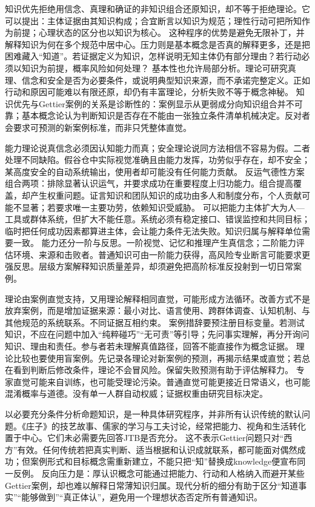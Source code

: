 知识优先拒绝用信念、真理和确证的非知识组合还原知识，却不等于拒绝理论。它可以提出：主体证据由其知识构成；合宜断言以知识为规范；理性行动可把所知作为前提；心理状态的区分也以知识为核心\parencite{williamson2000}。 这种程序的优势是避免无限补丁，并解释知识为何在多个规范中居中心。压力则是基本概念是否真的解释更多，还是把困难藏入“知道”。若证据定义为知识，怎样说明无知主体仍有部分理由？若行动必须以知识为前提，概率风险如何处理？ 基本性也允许局部分析。理论可研究真理、信念和安全是否为必要条件，或说明典型知识来源，而不承诺完整定义。正如行动和原因可能难以有限还原，却仍有丰富理论，分析失败不等于概念神秘。 知识优先与Gettier案例的关系是诊断性的：案例显示从更弱成分向知识组合并不可靠；基本概念论认为判断知识是否存在不能由一张独立条件清单机械决定。反对者会要求可预测的新案例标准，而非只凭整体直觉。

能力理论说真信念必须因认知能力而真；安全理论说同方法相信不容易为假。二者处理不同缺陷。假谷仓中实际视觉准确且由能力发挥，功劳似乎存在，却不安全；某高度安全的自动系统输出，使用者却可能没有任何能力贡献。 反运气德性方案组合两项：排除显著认识运气，并要求成功在重要程度上归功能力\parencite{pritchard2012}。组合提高覆盖，却产生权重问题。证言知识和团队知识的成功由多人和制度分布，个人贡献可能不显著；若要求唯一主要功劳，依赖知识受威胁。 可以把能力主体扩大为人—工具或群体系统，但扩大不能任意。系统必须有稳定接口、错误监控和共同目标；临时把任何成功因素都算进主体，会让能力条件无法失败。知识归属与解释单位需要一致。 能力还分一阶与反思。一阶视觉、记忆和推理产生真信念；二阶能力评估环境、来源和击败者。普通知识可由一阶能力获得，高风险专业断言可能要求更强反思。层级方案解释知识质量差异，却须避免把高阶标准反投射到一切日常案例。

理论由案例直觉支持，又用理论解释相同直觉，可能形成方法循环。改善方式不是放弃案例，而是增加证据来源：最小对比、语言使用、跨群体调查、认知机制、与其他规范的系统联系。不同证据互相约束。 案例措辞要预注册目标变量。若测试知识，不应在问题中加入“纯粹碰巧”“无可责”等引导；先问事实理解，再分开询问知识、理由和责任。参与者若未理解真值路径，回答不能直接作为概念证据。 理论比较也要使用盲案例。先记录各理论对新案例的预测，再揭示结果或直觉；若总在看到判断后修改条件，理论不会冒风险。保留失败预测有助于评估解释力。 专家直觉可能来自训练，也可能受理论污染。普通直觉可能更接近日常语义，也可能混淆概率与道德。没有单一人群自动权威；证据权重由研究目标决定。

以必要充分条件分析命题知识，是一种具体研究程序，并非所有认识传统的默认问题。《庄子》的技艺故事、儒家的学习与工夫讨论，经常把能力、视角和生活转化置于中心\parencite{analects2003,zhuangzi2009}。它们未必需要先回答JTB是否充分。 这不表示Gettier问题只对“西方”有效。任何传统若把真实判断、适当根据和认识成就联系，都可能面对偶然成功；但案例形式和目标概念需重新建立，不能只把“知”替换成knowledge便宣布同一反例。 反向压力是：厚认识概念可能通过把能力、行动和人格纳入而避开某些Gettier案例，却也难以解释日常薄知识归属。现代分析的细分有助于区分“知道事实”“能够做到”“真正体认”，避免用一个理想状态否定所有普通知识。

